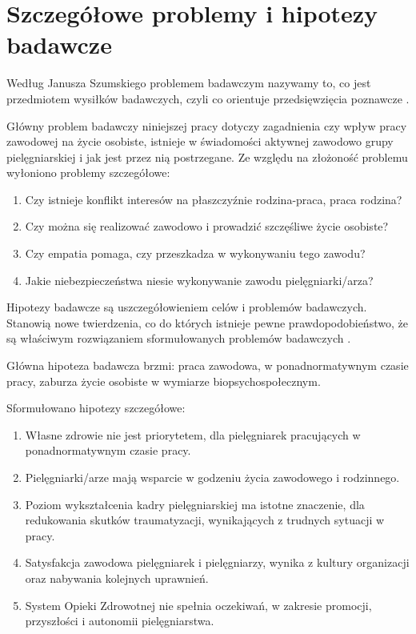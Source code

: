 \documentclass[a4paper,12pt,twoside,openany]{report}
\begin{document}
\section{Szczegółowe problemy i hipotezy badawcze}
Według Janusza Szumskiego problemem badawczym nazywamy to, co jest przedmiotem wysiłków badawczych, czyli co orientuje przedsięwzięcia poznawcze \cite{janusz}.

Główny problem badawczy niniejszej pracy dotyczy zagadnienia czy wpływ pracy zawodowej na życie osobiste, istnieje w świadomości aktywnej zawodowo grupy pielęgniarskiej i jak jest przez nią postrzegane. Ze względu na złożoność problemu wyłoniono problemy szczegółowe:
\begin{enumerate}
	\item Czy istnieje konflikt interesów na płaszczyźnie rodzina-praca, praca rodzina?
	\item Czy można się realizować zawodowo i prowadzić szczęśliwe życie osobiste?
	\item Czy empatia pomaga, czy przeszkadza w wykonywaniu tego zawodu?
	\item Jakie niebezpieczeństwa niesie wykonywanie zawodu pielęgniarki/arza?
\end{enumerate}

Hipotezy badawcze są uszczegółowieniem celów i problemów badawczych. Stanowią nowe twierdzenia, co do których istnieje pewne prawdopodobieństwo, że są właściwym rozwiązaniem sformułowanych problemów badawczych \cite{janusz}.

Główna hipoteza badawcza brzmi: praca zawodowa, w ponadnormatywnym czasie pracy, zaburza życie osobiste w wymiarze biopsychospołecznym.

Sformułowano hipotezy szczegółowe:
\begin{enumerate}
	\item Własne zdrowie nie jest priorytetem, dla pielęgniarek pracujących w ponadnormatywnym czasie pracy.
	\item Pielęgniarki/arze mają wsparcie w  godzeniu życia zawodowego i rodzinnego.
	\item Poziom wykształcenia kadry pielęgniarskiej ma istotne znaczenie, dla  redukowania skutków traumatyzacji, wynikających z trudnych sytuacji w pracy.
	\item Satysfakcja zawodowa pielęgniarek i pielęgniarzy, wynika z kultury organizacji oraz nabywania kolejnych uprawnień.
	\item System Opieki Zdrowotnej nie spełnia oczekiwań, w zakresie promocji, przyszłości i autonomii pielęgniarstwa.
\end{enumerate}
\end{document}
